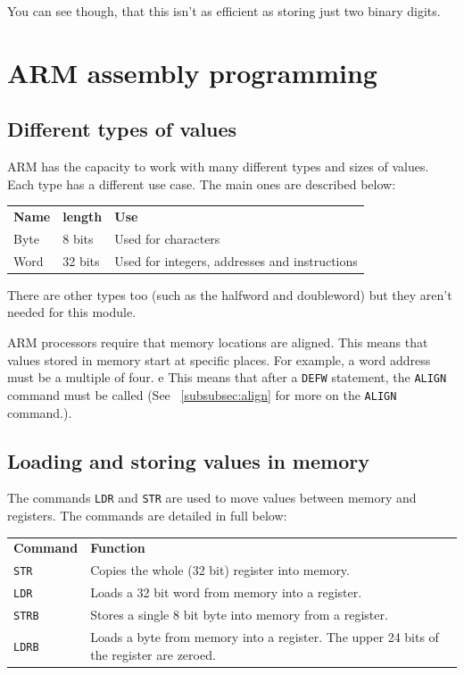 You can see though, that this isn't as efficient as storing just two binary
digits.

\section{ARM assembly programming}

\subsection{Different types of values}

ARM has the capacity to work with many different types and sizes of values. Each
type has a different use case. The main ones are described below:

\begin{tabularx}{\textwidth}{l l X}
	{\bf Name} & {\bf length} & {\bf Use}\\
	Byte & 8 bits & Used for characters\\
	Word & 32 bits & Used for integers, addresses and instructions\\
\end{tabularx}

There are other types too (such as the halfword and doubleword) but they aren't
needed for this module.

ARM processors require that memory locations are aligned. This means that values
stored in memory start at specific places. For example, a word address must be a
multiple of four.
e
This means that after a {\tt DEFW} statement, the {\tt ALIGN} command must be
called (See ~\ref{subsubsec:align} for more on the {\tt ALIGN} command.).

\subsection{Loading and storing values in memory}

The commands {\tt LDR} and {\tt STR} are used to move values between memory and
registers. The commands are detailed in full below:

\begin{tabularx}{\textwidth}{l X}
	{\bf Command} & {\bf Function}\\
	{\tt STR} & Copies the whole (32 bit) register into memory.\\
	{\tt LDR} & Loads a 32 bit word from memory into a register.\\
	{\tt STRB} & Stores a single 8 bit byte into memory from a register.\\
	{\tt LDRB} & Loads a byte from memory into a register. The upper 24 bits of
	the register are zeroed.\\
\end{tabularx}

